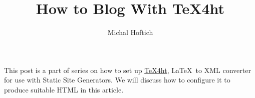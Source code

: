 \documentclass{article}
\title{How to Blog With TeX4ht}
\author{Michal Hoftich}
\begin{document}
\maketitle

This post is a part of series on how to set up
\href{https://tug.org/tex4ht/}{TeX4ht}, \LaTeX\ to XML converter
for use with Static Site Generators. We will discuss
how to configure it to produce suitable HTML in this article.
\end{document}
